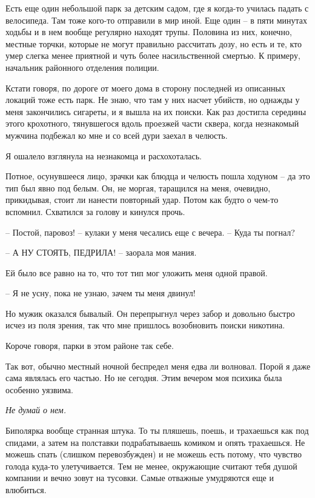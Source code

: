 \documentclass[
]{book}
\begin{document}
Есть еще один небольшой парк за детским садом, где я когда-то училась падать с велосипеда. Там тоже кого-то отправили в мир иной. Еще один -- в пяти минутах ходьбы и в нем вообще регулярно находят трупы. Половина из них, конечно, местные торчки, которые не могут правильно рассчитать дозу, но есть и те, кто умер слегка менее приятной и чуть более насильственной смертью. К примеру, начальник районного отделения полиции.

Кстати говоря, по дороге от моего дома в сторону последней из описанных локаций тоже есть парк. Не знаю, что там у них насчет убийств, но однажды у меня закончились сигареты, и я вышла на их поиски. Как раз достигла середины этого крохотного, тянувшегося вдоль проезжей части сквера, когда незнакомый мужчина подбежал ко мне и со всей дури заехал в челюсть.

Я ошалело взглянула на незнакомца и расхохоталась.

Потное, осунувшееся лицо, зрачки как блюдца и челюсть пошла ходуном -- да это тип был явно под белым. Он, не моргая, таращился на меня, очевидно, прикидывая, стоит ли нанести повторный удар. Потом как будто о чем-то вспомнил. Схватился за голову и кинулся прочь.

-- Постой, паровоз! -- кулаки у меня чесались еще с вечера. -- Куда ты погнал?

-- А НУ СТОЯТЬ, ПЕДРИЛА! -- заорала моя мания.

Ей было все равно на то, что тот тип мог уложить меня одной правой.

-- Я не усну, пока не узнаю, зачем ты меня двинул!

Но мужик оказался бывалый. Он перепрыгнул через забор и довольно быстро исчез из поля зрения, так что мне пришлось возобновить поиски никотина.

Короче говоря, парки в этом районе так себе.

Так вот, обычно местный ночной беспредел меня едва ли волновал. Порой я даже сама являлась его частью. Но не сегодня. Этим вечером моя психика была особенно уязвима.

\emph{Не думай о нем.}

Биполярка вообще странная штука. То ты пляшешь, поешь, и трахаешься как под спидами, а затем на полставки подрабатываешь комиком и опять трахаешься. Не можешь спать (слишком перевозбужден) и не можешь есть потому, что чувство голода куда-то улетучивается. Тем не менее, окружающие считают тебя душой компании и вечно зовут на тусовки. Самые отважные умудряются еще и влюбиться.
\end{document}
